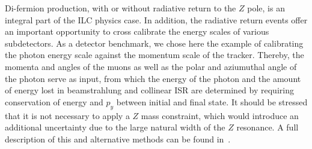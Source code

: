 Di-fermion production, with or without radiative return to the $Z$ pole, is an integral part of the ILC physics case. In addition, the radiative return events offer an important
opportunity to cross calibrate the energy scales of various subdetectors. As a detector benchmark, we chose here the example of calibrating the photon energy scale against the momentum scale of the tracker. Thereby, the momenta and angles of the muons as well as the 
polar and aziumuthal angle of the photon serve as input, from which the energy of the photon and the amount of energy lost in beamstrahlung and collinear ISR are determined by
requiring conservation of energy and $p_y$ between initial and final state. It should be stressed that it is not necessary to apply a $Z$ mass constraint, which would introduce an additional uncertainty due to the large natural width of the $Z$ resonance. A full description of this and alternative methods can be found in~\cite{ILDNote:gammaZ}.
 


